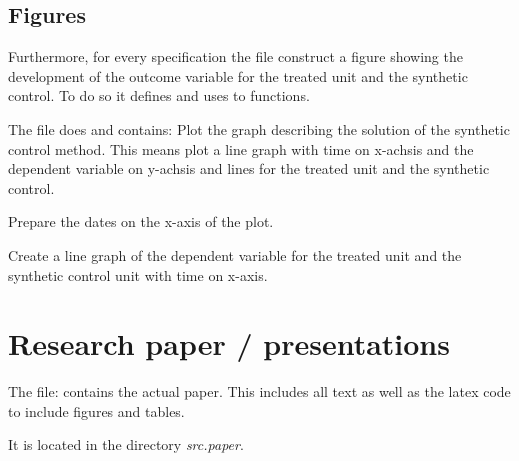 \documentclass[a4paper,11pt,english]{sphinxmanual}
\begin{document}
\section{Figures}
\label{final:figures}
Furthermore, for every specification the file  construct a figure showing the development of the outcome variable for the treated unit and the synthetic control.
To do so it defines and uses to functions.

The file does and contains:
\label{final:module-src.final.plot_sc_graph}
Plot the graph describing the solution of the synthetic control method.
This means plot a line graph with time on x-achsis and the dependent variable
on y-achsis and lines for the treated unit and the synthetic control.

\begin{fulllineitems}
\label{final:src.final.plot_sc_graph.get_dates_for_x_axsis}
Prepare the dates on the x-axis of the plot.

\end{fulllineitems}


\begin{fulllineitems}
\label{final:src.final.plot_sc_graph.plot_dep_var}
Create a line graph of the dependent variable for the treated unit and
the synthetic control unit with time on x-axis.

\end{fulllineitems}



\chapter{Research paper / presentations}
\label{paper:research-paper-presentations}\label{paper:paper}\label{paper::doc}
The file:  contains the actual paper. This includes all text as well as the latex code to include figures and tables.

It is located in the directory \emph{src.paper}.
\end{document}
